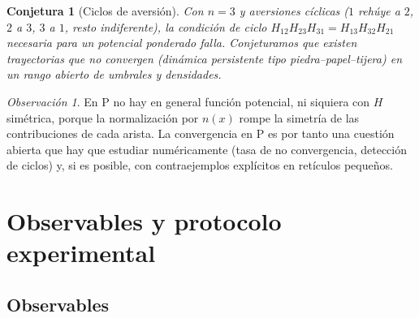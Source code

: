 \documentclass[11pt,a4paper]{article}
\theoremstyle{plain}
\newtheorem{conjetura}{Conjetura}
\theoremstyle{definition}
\theoremstyle{remark}
\newtheorem{observacion}{Observación}
\newcommand{\modP}{\textsf{P}}
\begin{document}
\begin{conjetura}[Ciclos de aversión]\label{conj:ciclo}
Con $n=3$ y aversiones cíclicas ($1$ rehúye a $2$, $2$ a $3$, $3$ a $1$, resto
indiferente), la condición de ciclo
$H_{12}H_{23}H_{31}=H_{13}H_{32}H_{21}$ necesaria para un potencial ponderado
falla. Conjeturamos que existen trayectorias que no convergen (dinámica
persistente tipo piedra--papel--tijera) en un rango abierto de umbrales y
densidades.
\end{conjetura}

\begin{observacion}
En \modP{} no hay en general función potencial, ni siquiera con $H$ simétrica,
porque la normalización por $n(x)$ rompe la simetría de las contribuciones de
cada arista. La convergencia en \modP{} es por tanto una cuestión abierta que
hay que estudiar numéricamente (tasa de no convergencia, detección de ciclos) y,
si es posible, con contraejemplos explícitos en retículos pequeños.
\end{observacion}

\section{Observables y protocolo experimental}
\label{sec:protocolo}

\subsection{Observables}
\end{document}
